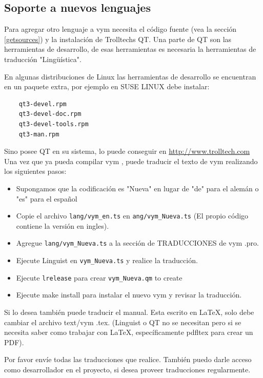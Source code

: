 \documentclass{article}
\newcommand{\vym}{{\sc vym }}
\begin{document}
\begin{appendix}
\subsection{Soporte a nuevos lenguajes}
Para agregar otro lenguaje a \vym necesita el c\'odigo fuente (vea la secci\'on \ref{getsources})  y la instalaci\'on de Trolltechs QT. Una parte de QT son las herramientas de desarrollo, de esas herramientas es necesaria la herramientas de traducci\'on "Lingü\'istica".

En algunas distribuciones de Linux las herramientas de desarrollo se encuentran en un paquete extra, por ejemplo en SUSE LINUX debe instalar:
\begin{verbatim}
    qt3-devel.rpm
    qt3-devel-doc.rpm
    qt3-devel-tools.rpm
    qt3-man.rpm
\end{verbatim}
Sino posee QT en su sistema, lo puede conseguir en 
    \href{http://www.trolltech.com}{http://www.trolltech.com}
Una vez que ya pueda compilar \vym, puede traducir el texto de \vym realizando los siguientes pasos:
\begin{itemize}
    \item Supongamos que la codificaci\'on es "Nueva" en lugar de "de" para el alem\'an o "es" para el espa\~nol
    
    \item Copie el archivo {\tt lang/vym\_en.ts} en {\tt ang/vym\_Nueva.ts} (El propio c\'odigo contiene la versi\'on en ingles). 
        
    \item Agregue  {\tt lang/vym\_Nueva.ts} a la secci\'on de TRADUCCIONES de \vym.pro. 

    \item Ejecute Linguist en {\tt vym\_Nueva.ts} y realice la traducci\'on.  

    \item Ejecute {\tt lrelease}  para crear {\tt vym\_Nueva.qm} to create 

    \item Ejecute make install para instalar el nuevo \vym y revisar la traducci\'on.
\end{itemize}

Si lo desea tambi\'en puede traducir el manual. Esta escrito en LaTeX, solo debe cambiar el archivo text/\vym.tex. (Linguist o QT no se necesitan pero si se necesita saber como trabajar con LaTeX, espec\'ificamente pdfltex para crear un PDF).

Por favor env\'ie todas las traducciones que realice. Tambi\'en puedo darle acceso como desarrollador en el proyecto, si desea proveer traducciones regularmente.


\end{appendix}
\end{document}
